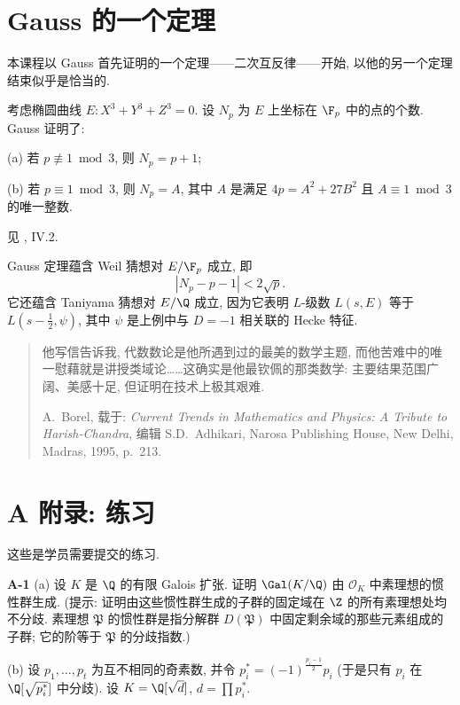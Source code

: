 \section*{Gauss 的一个定理}\label{sec:VIII.gauss}

本课程以 Gauss 首先证明的一个定理——二次互反律——开始, 以他的另一个定理结束似乎是恰当的.

考虑椭圆曲线 $E\colon X^{3}+Y^{3}+Z^{3}=0$. 设 $N_p$ 为 $E$ 上坐标在 $\F_p$ 中的点的个数. Gauss 证明了:

(a) 若 $p\not\equiv 1 \bmod 3$, 则 $N_p=p+1$;

(b) 若 $p\equiv 1 \bmod 3$, 则 $N_p=A$, 其中 $A$ 是满足 $4p=A^{2}+27B^{2}$ 且 $A\equiv 1 \bmod 3$ 的唯一整数.

见 \cite{SilvermanTate1992}, IV.2.

Gauss 定理蕴含 Weil 猜想对 $E/\F_p$ 成立, 即
\[
|N_{p}-p-1|<2\sqrt{p}.
\]
它还蕴含 Taniyama 猜想对 $E/\Q$ 成立, 因为它表明 $L$-级数 $L(s,E)$ 等于 $L(s-\frac{1}{2},\psi)$, 其中 $\psi$ 是上例中与 $D=-1$ 相关联的 Hecke 特征.

\begin{quote}
他写信告诉我, 代数数论是他所遇到过的最美的数学主题, 而他苦难中的唯一慰藉就是讲授类域论……这确实是他最钦佩的那类数学: 主要结果范围广阔、美感十足, 但证明在技术上极其艰难.

A.~Borel, 载于: \emph{Current Trends in Mathematics and Physics: A Tribute to Harish-Chandra}, 编辑 S.D.~Adhikari, Narosa Publishing House, New Delhi, Madras, 1995, p.~213.
\end{quote}



\cleardoublepage{}
\section*{A 附录: 练习}\label{sec:VIII.A}

这些是学员需要提交的练习.

\medskip\noindent\textbf{A-1}\quad
(a) 设 $K$ 是 $\Q$ 的有限 Galois 扩张. 证明 $\Gal(K/\Q)$ 由 $\mathcal{O}_K$ 中素理想的惯性群生成. (提示: 证明由这些惯性群生成的子群的固定域在 $\Z$ 的所有素理想处均不分歧. 素理想 $\mathfrak{P}$ 的惯性群是指分解群 $D(\mathfrak{P})$ 中固定剩余域的那些元素组成的子群; 它的阶等于 $\mathfrak{P}$ 的分歧指数.)

(b) 设 $p_1,\ldots,p_t$ 为互不相同的奇素数, 并令 $p_i^{*}=(-1)^{\frac{p_i-1}{2}}p_i$ (于是只有 $p_i$ 在 $\Q[\sqrt{p_i^{*}}]$ 中分歧). 设 $K=\Q[\sqrt{d}]$, $d=\prod p_i^{*}$.

